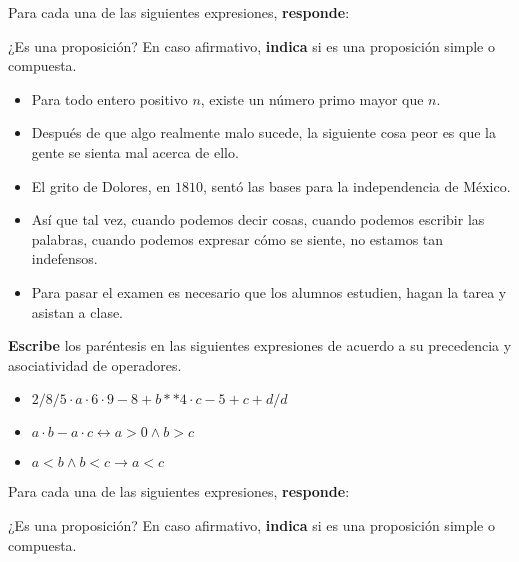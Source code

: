 \documentclass[oneside]{style}
\begin{document}
\begin{questions}[label=\protect\circled{\bfseries\arabic*}]
    \question
    {
        Para cada una de las siguientes expresiones, \textbf{responde}:
        \begin{center}
            ¿Es una proposición? En caso afirmativo, \textbf{indica} si 
            es una proposición simple o compuesta. 
        \end{center}

        \begin{itemize}
            \item Para todo entero positivo $n$, existe un número primo mayor
            que $n$.  
            \item Después de que algo realmente malo sucede, la siguiente cosa 
            peor es que la gente se sienta mal acerca de ello. 
            \item El grito de Dolores, en $1810$, sentó las bases para la 
            independencia de México. 
            \item  Así que tal vez, cuando podemos decir cosas, cuando podemos 
            escribir las palabras, cuando podemos expresar cómo se siente, no 
            estamos tan indefensos. 
            \item Para pasar el examen es necesario que los alumnos estudien, 
            hagan la tarea y asistan a clase. 
        \end{itemize}
    }

    \question
    {
        \textbf{Escribe} los paréntesis en las siguientes expresiones de 
        acuerdo a su precedencia y asociatividad de operadores.
        \begin{itemize}
            \item $2/8/5 \cdot a \cdot 6 \cdot 9 - 8 + b**4 \cdot c - 5 
            + c + d/d$

            \item $a \cdot b - a \cdot c \leftrightarrow a > 0 \land 
            b >c$

            \item $a < b \land b < c \rightarrow a < c$
        \end{itemize}
    }

    \question
    {
        Para cada una de las siguientes expresiones, \textbf{responde}:
        \begin{center}
            ¿Es una proposición? En caso afirmativo, \textbf{indica} si 
            es una proposición simple o compuesta. 
        \end{center}

}
\end{questions}
\end{document}
